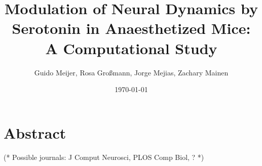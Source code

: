 \documentclass[11pt, a4paper]{report}
\title{Modulation of Neural Dynamics by Serotonin in Anaesthetized Mice: A Computational Study}
\author{Guido Meijer, Rosa Großmann, Jorge Mejias, Zachary Mainen}
\date{\today}
\begin{document}
\maketitle

\section*{Abstract}

(* Possible journals: J Comput Neurosci, PLOS Comp Biol, ? *)
\cite{jercogUPDOWNCorticalDynamics2017}
    
    
    
    
    

    
    
\end{document}

